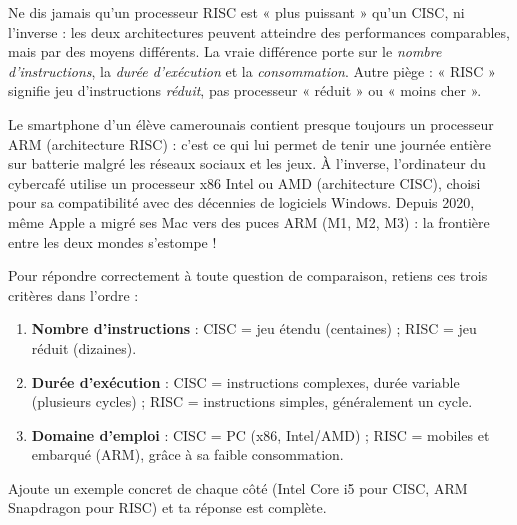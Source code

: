 \documentclass[11pt]{article}
\newcommand{\cle}[1]{{\popxbold\color{popdark}#1}}
\begin{document}
\begin{attention}
Ne dis jamais qu'un processeur RISC est « plus puissant » qu'un CISC, ni l'inverse : les deux architectures peuvent atteindre des performances comparables, mais par des moyens différents. La vraie différence porte sur le \emph{nombre d'instructions}, la \emph{durée d'exécution} et la \emph{consommation}. Autre piège : « RISC » signifie jeu d'instructions \emph{réduit}, pas processeur « réduit » ou « moins cher ».
\end{attention}

\begin{savaistu}
Le smartphone d'un élève camerounais contient presque toujours un processeur \cle{ARM} (architecture RISC) : c'est ce qui lui permet de tenir une journée entière sur batterie malgré les réseaux sociaux et les jeux. À l'inverse, l'ordinateur du cybercafé utilise un processeur \cle{x86} Intel ou AMD (architecture CISC), choisi pour sa compatibilité avec des décennies de logiciels Windows. Depuis 2020, même Apple a migré ses Mac vers des puces ARM (M1, M2, M3) : la frontière entre les deux mondes s'estompe !
\end{savaistu}

\begin{methode}
Pour répondre correctement à toute question de comparaison, retiens ces trois critères dans l'ordre :
\begin{enumerate}
  \item \textbf{Nombre d'instructions} : CISC = jeu étendu (centaines) ; RISC = jeu réduit (dizaines).
  \item \textbf{Durée d'exécution} : CISC = instructions complexes, durée variable (plusieurs cycles) ; RISC = instructions simples, généralement un cycle.
  \item \textbf{Domaine d'emploi} : CISC = PC (x86, Intel/AMD) ; RISC = mobiles et embarqué (ARM), grâce à sa faible consommation.
\end{enumerate}
Ajoute un exemple concret de chaque côté (Intel Core i5 pour CISC, ARM Snapdragon pour RISC) et ta réponse est complète.
\end{methode}
\end{document}
